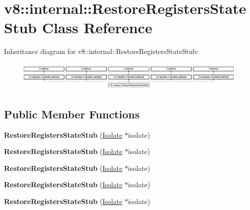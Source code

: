 \hypertarget{classv8_1_1internal_1_1_restore_registers_state_stub}{}\section{v8\+:\+:internal\+:\+:Restore\+Registers\+State\+Stub Class Reference}
\label{classv8_1_1internal_1_1_restore_registers_state_stub}
Inheritance diagram for v8\+:\+:internal\+:\+:Restore\+Registers\+State\+Stub\+:\begin{figure}[H]
\begin{center}
\leavevmode
\includegraphics[height=1.423729cm]{classv8_1_1internal_1_1_restore_registers_state_stub}
\end{center}
\end{figure}
\subsection*{Public Member Functions}
\begin{DoxyCompactItemize}
\item 
{\bfseries Restore\+Registers\+State\+Stub} (\hyperlink{classv8_1_1internal_1_1_isolate}{Isolate} $\ast$isolate)\hypertarget{classv8_1_1internal_1_1_restore_registers_state_stub_a3c1b86a983b78ea56d2e1fb9631a3671}{}\label{classv8_1_1internal_1_1_restore_registers_state_stub_a3c1b86a983b78ea56d2e1fb9631a3671}

\item 
{\bfseries Restore\+Registers\+State\+Stub} (\hyperlink{classv8_1_1internal_1_1_isolate}{Isolate} $\ast$isolate)\hypertarget{classv8_1_1internal_1_1_restore_registers_state_stub_a3c1b86a983b78ea56d2e1fb9631a3671}{}\label{classv8_1_1internal_1_1_restore_registers_state_stub_a3c1b86a983b78ea56d2e1fb9631a3671}

\item 
{\bfseries Restore\+Registers\+State\+Stub} (\hyperlink{classv8_1_1internal_1_1_isolate}{Isolate} $\ast$isolate)\hypertarget{classv8_1_1internal_1_1_restore_registers_state_stub_a3c1b86a983b78ea56d2e1fb9631a3671}{}\label{classv8_1_1internal_1_1_restore_registers_state_stub_a3c1b86a983b78ea56d2e1fb9631a3671}

\item 
{\bfseries Restore\+Registers\+State\+Stub} (\hyperlink{classv8_1_1internal_1_1_isolate}{Isolate} $\ast$isolate)\hypertarget{classv8_1_1internal_1_1_restore_registers_state_stub_a3c1b86a983b78ea56d2e1fb9631a3671}{}\label{classv8_1_1internal_1_1_restore_registers_state_stub_a3c1b86a983b78ea56d2e1fb9631a3671}

\item 
{\bfseries Restore\+Registers\+State\+Stub} (\hyperlink{classv8_1_1internal_1_1_isolate}{Isolate} $\ast$isolate)\hypertarget{classv8_1_1internal_1_1_restore_registers_state_stub_a3c1b86a983b78ea56d2e1fb9631a3671}{}\label{classv8_1_1internal_1_1_restore_registers_state_stub_a3c1b86a983b78ea56d2e1fb9631a3671}

\end{DoxyCompactItemize}
